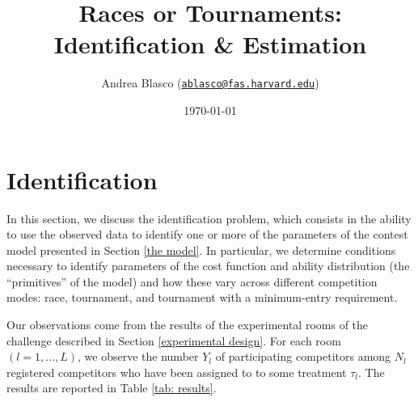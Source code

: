 \documentclass[]{article}
\title{Races or Tournaments: Identification \& Estimation}
\author{Andrea Blasco
(\href{mailto:ablasco@fas.harvard.edu}{\nolinkurl{ablasco@fas.harvard.edu}})}
\date{\today}
\theoremstyle{plain} %
\begin{document}
\maketitle


\clearpage
\tableofcontents
\setcounter{tocdepth}{2}
\clearpage

\section{Identification}\label{identification}

In this section, we discuss the identification problem, which consists
in the ability to use the observed data to identify one or more of the
parameters of the contest model presented in Section \ref{the model}. In
particular, we determine conditions necessary to identify parameters of
the cost function and ability distribution (the ``primitives'' of the
model) and how these vary across different competition modes: race,
tournament, and tournament with a minimum-entry requirement.

Our observations come from the results of the experimental rooms of the
challenge described in Section \ref{experimental design}. For each room
\((l=1, ..., L)\), we observe the number \(Y_l\) of participating
competitors among \(N_l\) registered competitors who have been assigned
to to some treatment \(\tau_l\). The results are reported in Table
\ref{tab: results}.
\end{document}
